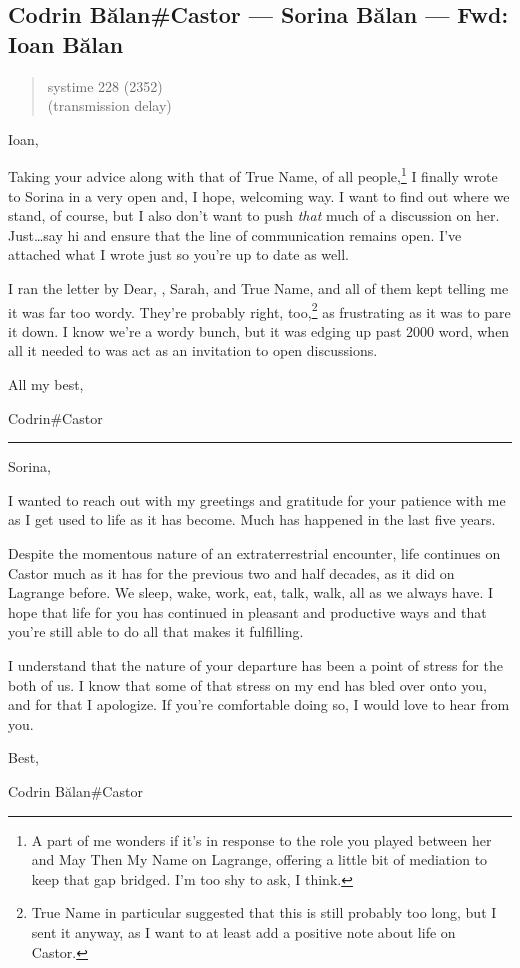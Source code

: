 \hypertarget{codrin-bux103lancastor-sorina-bux103lan-fwd-ioan-bux103lan}{%
\subsection{Codrin Bălan\#Castor — Sorina Bălan — Fwd: Ioan Bălan}\label{codrin-bux103lancastor-sorina-bux103lan-fwd-ioan-bux103lan}}

\begin{quote}
systime 228 (2352)\\
(transmission delay)
\end{quote}

Ioan,

Taking your advice along with that of True Name, of all people,\footnote{A part of me wonders if it's in response to the role you played between her and May Then My Name on Lagrange, offering a little bit of mediation to keep that gap bridged. I'm too shy to ask, I think.} I finally wrote to Sorina in a very open and, I hope, welcoming way. I want to find out where we stand, of course, but I also don't want to push \emph{that} much of a discussion on her. Just\ldots say hi and ensure that the line of communication remains open. I've attached what I wrote just so you're up to date as well.

I ran the letter by Dear, \Partner , Sarah, and True Name, and all of them kept telling me it was far too wordy. They're probably right, too,\footnote{True Name in particular suggested that this is still probably too long, but I sent it anyway, as I want to at least add a positive note about life on Castor.} as frustrating as it was to pare it down. I know we're a wordy bunch, but it was edging up past 2000 word, when all it needed to was act as an invitation to open discussions.

All my best,

Codrin\#Castor

\begin{center}\rule{0.5\linewidth}{0.5pt}\end{center}

Sorina,

I wanted to reach out with my greetings and gratitude for your patience with me as I get used to life as it has become. Much has happened in the last five years.

Despite the momentous nature of an extraterrestrial encounter, life continues on Castor much as it has for the previous two and half decades, as it did on Lagrange before. We sleep, wake, work, eat, talk, walk, all as we always have. I hope that life for you has continued in pleasant and productive ways and that you're still able to do all that makes it fulfilling.

I understand that the nature of your departure has been a point of stress for the both of us. I know that some of that stress on my end has bled over onto you, and for that I apologize. If you're comfortable doing so, I would love to hear from you.

Best,

Codrin Bălan\#Castor
